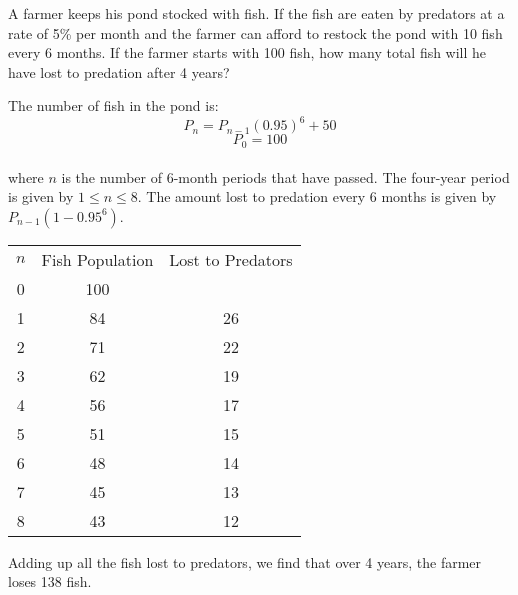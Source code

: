 \begin{Exercise}[label=seqcalc6]
A farmer keeps his pond stocked with fish. If the fish are eaten by predators 
at a rate of 5\% per month and the farmer can afford to restock the pond with 
10 fish every 6 months. If the farmer starts with 100 fish, how many total fish 
will he have lost to predation after 4 years?
\end{Exercise}

\begin{Answer}[ref=seqcalc6]
The number of fish in the pond is:
$$P_n = P_{n-1}(0.95)^6 + 50$$
$$P_0 = 100$$\\
where $n$ is the number of 6-month periods that have passed. The four-year 
period is given by $1 \leq n \leq 8$. The amount lost to predation every 6 
months is given by $P_{n-1}(1-0.95^6)$.
\begin{center}
\begin{tabular}{|c|c|c|}\hline
$n$ & Fish Population & Lost to Predators\\
0 & 100 & \\
\hline
1 & 84 & 26\\
\hline
2 & 71 & 22\\
\hline
3 & 62 & 19\\
\hline
4 & 56 & 17\\
\hline
5 & 51 & 15\\
\hline
6 & 48 & 14\\
\hline
7 & 45 & 13\\
\hline
8 & 43 & 12\\
\hline

\end{tabular}
\end{center}
Adding up all the fish lost to predators, we find that over 4 years, the farmer loses 138 fish. 
\end{Answer}






